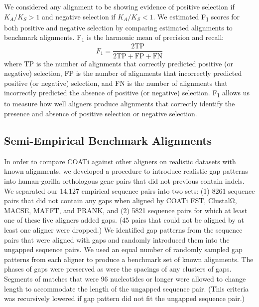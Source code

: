 \documentclass[12pt,letterpaper]{article}
\begin{document}
We considered any alignment to be showing evidence of positive selection if $K_A/K_S > 1$ and negative selection if $K_A/K_S < 1$. We estimated F\textsubscript{1} scores for both positive and negative selection by comparing estimated alignments to benchmark alignments. F\textsubscript{1} is the harmonic mean of precision and recall:
\[
F_1 = \frac{2 \text{TP}}{2 \text{TP} + \text{FP} + \text{FN}}
\]
where TP is the number of alignments that correctly predicted positive (or negative) selection, FP is the number of alignments that incorrectly predicted positive (or negative) selection, and FN is the number of alignments that incorrectly predicted the absence of positive (or negative) selection. F\textsubscript{1} allows us to measure how well aligners produce alignments that correctly identify the presence and absence of positive selection or negative selection.

\subsection*{Semi-Empirical Benchmark Alignments}

In order to compare COATi against other aligners on realistic datasets with known alignments, we developed a procedure to introduce realistic gap patterns into human-gorilla orthologous gene pairs that did not previous contain indels. We separated our 14,127 empirical sequence pairs into two sets: %
(1) 8261 sequence pairs that did not contain any gaps when aligned by COATi FST, ClustalΩ, MACSE, MAFFT, and PRANK, and (2) 5821 sequence pairs for which at least one of these five aligners added gaps.
(45 pairs that could not be aligned by at least one aligner were dropped.) We identified gap patterns from the sequence pairs that were aligned with gaps and randomly introduced them into the ungapped sequence pairs. We used an equal number of randomly sampled gap patterns from each aligner to produce a benchmark set of known alignments. The phases of gaps were preserved as were the spacings of any clusters of gaps. Segments of matches that were 96 nucleotides or longer were allowed to change length to accommodate the length of the ungapped sequence pair. (This criteria was recursively lowered if gap pattern did not fit the ungapped sequence pair.)
\end{document}
